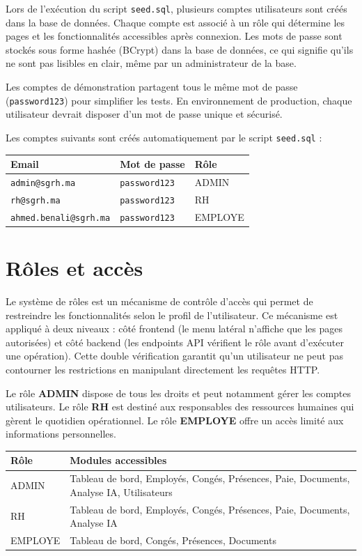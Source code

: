 \documentclass[12pt,a4paper]{report}
\begin{document}
Lors de l'exécution du script \texttt{seed.sql}, plusieurs comptes utilisateurs sont créés dans la base de données. Chaque compte est associé à un rôle qui détermine les pages et les fonctionnalités accessibles après connexion. Les mots de passe sont stockés sous forme hashée (BCrypt) dans la base de données, ce qui signifie qu'ils ne sont pas lisibles en clair, même par un administrateur de la base.

Les comptes de démonstration partagent tous le même mot de passe (\texttt{password123}) pour simplifier les tests. En environnement de production, chaque utilisateur devrait disposer d'un mot de passe unique et sécurisé.

Les comptes suivants sont créés automatiquement par le script \texttt{seed.sql} :

\begin{longtable}{|p{5cm}|p{4cm}|p{3cm}|}
\hline
\textbf{Email} & \textbf{Mot de passe} & \textbf{Rôle} \\
\hline
\texttt{admin@sgrh.ma} & \texttt{password123} & ADMIN \\
\hline
\texttt{rh@sgrh.ma} & \texttt{password123} & RH \\
\hline
\texttt{ahmed.benali@sgrh.ma} & \texttt{password123} & EMPLOYE \\
\hline
\end{longtable}

\section{Rôles et accès}

Le système de rôles est un mécanisme de contrôle d'accès qui permet de restreindre les fonctionnalités selon le profil de l'utilisateur. Ce mécanisme est appliqué à deux niveaux : côté frontend (le menu latéral n'affiche que les pages autorisées) et côté backend (les endpoints API vérifient le rôle avant d'exécuter une opération). Cette double vérification garantit qu'un utilisateur ne peut pas contourner les restrictions en manipulant directement les requêtes HTTP.

Le rôle \textbf{ADMIN} dispose de tous les droits et peut notamment gérer les comptes utilisateurs. Le rôle \textbf{RH} est destiné aux responsables des ressources humaines qui gèrent le quotidien opérationnel. Le rôle \textbf{EMPLOYE} offre un accès limité aux informations personnelles.

\begin{longtable}{|p{3cm}|p{10cm}|}
\hline
\textbf{Rôle} & \textbf{Modules accessibles} \\
\hline
ADMIN & Tableau de bord, Employés, Congés, Présences, Paie, Documents, Analyse IA, Utilisateurs \\
\hline
RH & Tableau de bord, Employés, Congés, Présences, Paie, Documents, Analyse IA \\
\hline
EMPLOYE & Tableau de bord, Congés, Présences, Documents \\
\hline
\end{longtable}
\end{document}
